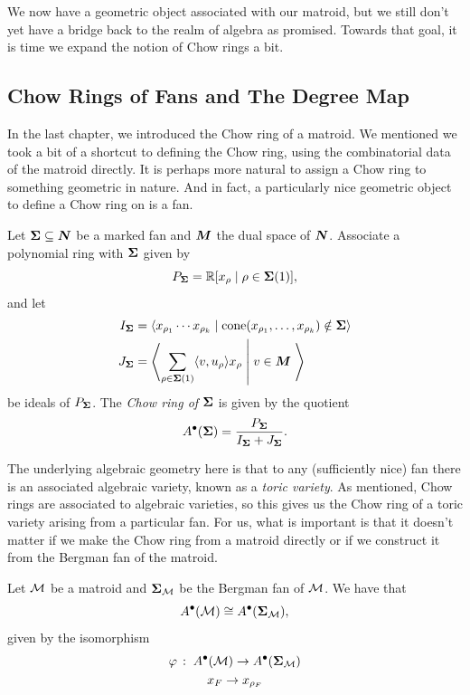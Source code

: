 \documentclass[12pt,oneside]{../../sfsuthesis}
\begin{document}
We now have a geometric object associated with our matroid, but we still don't yet have a bridge back to the realm of algebra as promised.
Towards that goal, it is time we expand the notion of Chow rings a bit.

\subsection{Chow Rings of Fans and The Degree Map}

In the last chapter, we introduced the Chow ring of a matroid.
We mentioned we took a bit of a shortcut to defining the Chow ring, using the combinatorial data of the matroid directly.
It is perhaps more natural to assign a Chow ring to something geometric in nature.
And in fact, a particularly nice geometric object to define a Chow ring on is a fan.
\begin{definition}\th\label{def:ChowRingFan}
    Let \( {\bm{\Sigma}} \subseteq \bm{N} \) be a marked fan and \( \bm{M} \) the dual space of \( \bm{N} \).
    Associate a polynomial ring with \( {\bm{\Sigma}} \) given by
    \[
        P_{\bm{\Sigma}} = \mathbb{R} [ x_\rho \; | \; \rho \in {\bm{\Sigma}}(1) ],
    \]
    and let
    \begin{align*}
        I_{\bm{\Sigma}} & = \langle x_{\rho_1} \cdots x_{\rho_k} \; | \; \mathrm{cone}(x_{\rho_1}, \dots, x_{\rho_k}) \notin {\bm{\Sigma}} \rangle            \\
        J_{\bm{\Sigma}} & = \left\langle \sum_{\rho \in {\bm{\Sigma}}(1)} \langle v, u_\rho \rangle x_\rho \; \middle| \; v \in \bm{M}  \; \right\rangle
    \end{align*}
    be ideals of \( P_{\bm{\Sigma}} \).
    The \emph{Chow ring of \( {\bm{\Sigma}} \)} is given by the quotient
    \[
        A^\bullet({\bm{\Sigma}}) = \frac{P_{\bm{\Sigma}}}{I_{\bm{\Sigma}} + J_{\bm{\Sigma}}}.
    \]
\end{definition}
The underlying algebraic geometry here is that to any (sufficiently nice) fan there is an associated algebraic variety, known as a \emph{toric variety}.
As mentioned, Chow rings are associated to algebraic varieties, so this gives us the Chow ring of a toric variety arising from a particular fan.
For us, what is important is that it doesn't matter if we make the Chow ring from a matroid directly or if we construct it from the Bergman fan of the matroid.
\begin{proposition}\th\label{thm:chowRingIso}
    Let \( \mathcal{M} \) be a matroid and \( {\bm{\Sigma}}_{\mathcal{M}} \) be the Bergman fan of \( \mathcal{M} \).
    We have that
    \[
        A^\bullet(\mathcal{M}) \cong A^\bullet({\bm{\Sigma}}_{\mathcal{M}}),
    \]
    given by the isomorphism
    \begin{gather*}
        \varphi \,:\; A^\bullet(\mathcal{M}) \to A^\bullet({\bm{\Sigma}}_{\mathcal{M}}) \\
        x_F \to x_{\rho_F}
    \end{gather*}
\end{proposition}
\end{document}
